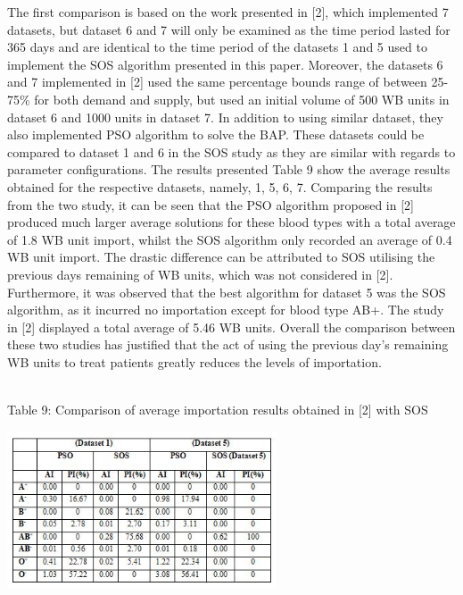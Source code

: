 \documentclass{article}
\begin{document}
The first comparison is based on the work presented in [2], which implemented 7 datasets, but dataset 6 and 7 will only be examined as the time period lasted for 365 days and are identical to the time period of the datasets 1 and 5 used to implement the SOS algorithm presented in this paper. Moreover, the datasets 6 and 7 implemented in [2] used the same percentage bounds range of between 25-75\% for both demand and supply, but used an initial volume of 500 WB units in dataset 6 and 1000 units in dataset 7.  In addition to using similar dataset, they also implemented PSO algorithm to solve the BAP. These datasets could be compared to dataset 1 and 6 in the SOS study as they are similar with regards to parameter configurations. The results presented Table 9 show the average results obtained for the respective datasets, namely, 1, 5, 6, 7. Comparing the results from the two study, it can be seen that the PSO algorithm proposed in [2] produced much larger average solutions for these blood types with a total average of 1.8 WB unit import, whilst the SOS algorithm only recorded an average of 0.4 WB unit import. The drastic difference can be attributed to SOS utilising the previous days remaining of WB units, which was not considered in [2]. Furthermore, it was observed that the best algorithm for dataset 5 was the SOS algorithm, as it incurred no importation except for blood type AB+. The study in [2] displayed a total average of 5.46 WB units. Overall the comparison between these two studies has justified that the act of using the previous day’s remaining WB units to treat patients greatly reduces the levels of importation.\\
\\
\begin {center}
Table 9: {Comparison of average importation results obtained in [2] with SOS}

\end {center}
\includegraphics[width=0.6\textwidth, center]{Images/CompTab.JPG}
\\
\\
\end{document}
